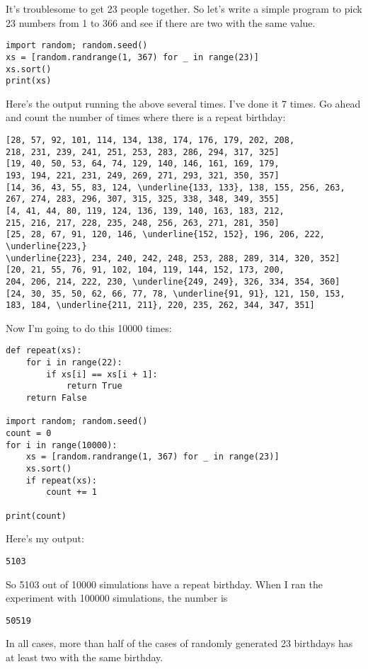 It's troublesome to get 23 people together.
So let's write a simple program to pick 23 numbers from 1 to 366
and see if there are two with the same value.
\begin{Verbatim}[frame=single, commandchars=\\\{\}, fontsize=\small]
import random; random.seed()
xs = [random.randrange(1, 367) for _ in range(23)]
xs.sort()
print(xs)
\end{Verbatim}
Here's the output running the above several times.
I've done it 7 times.
Go ahead and count the number of times where there is a repeat
birthday:
\begin{Verbatim}[frame=single, commandchars=\\\{\}, fontsize=\small]
[28, 57, 92, 101, 114, 134, 138, 174, 176, 179, 202, 208, 
218, 231, 239, 241, 251, 253, 283, 286, 294, 317, 325]
[19, 40, 50, 53, 64, 74, 129, 140, 146, 161, 169, 179, 
193, 194, 221, 231, 249, 269, 271, 293, 321, 350, 357]
[14, 36, 43, 55, 83, 124, \underline{133, 133}, 138, 155, 256, 263, 
267, 274, 283, 296, 307, 315, 325, 338, 348, 349, 355]
[4, 41, 44, 80, 119, 124, 136, 139, 140, 163, 183, 212, 
215, 216, 217, 228, 235, 248, 256, 263, 271, 281, 350]
[25, 28, 67, 91, 120, 146, \underline{152, 152}, 196, 206, 222, \underline{223,} 
\underline{223}, 234, 240, 242, 248, 253, 288, 289, 314, 320, 352]
[20, 21, 55, 76, 91, 102, 104, 119, 144, 152, 173, 200, 
204, 206, 214, 222, 230, \underline{249, 249}, 326, 334, 354, 360]
[24, 30, 35, 50, 62, 66, 77, 78, \underline{91, 91}, 121, 150, 153, 
183, 184, \underline{211, 211}, 220, 235, 262, 344, 347, 351]
\end{Verbatim}
Now I'm going to do this 10000 times:
\begin{Verbatim}[frame=single, commandchars=\\\{\}, fontsize=\small]
def repeat(xs):
    for i in range(22):
        if xs[i] == xs[i + 1]:
            return True
    return False

import random; random.seed()
count = 0
for i in range(10000):
    xs = [random.randrange(1, 367) for _ in range(23)]
    xs.sort()
    if repeat(xs): 
        count += 1

print(count)
\end{Verbatim}
Here's my output:
\begin{Verbatim}[frame=single, commandchars=\\\{\}, fontsize=\small]
5103
\end{Verbatim}
So 5103 out of 10000 simulations have a repeat birthday.
When I ran the experiment with 100000 simulations, the number is 
\begin{Verbatim}[frame=single, commandchars=\\\{\}, fontsize=\small]
50519
\end{Verbatim}
In all cases, more than half of the cases of randomly generated
23 birthdays has at least two with the same birthday.

